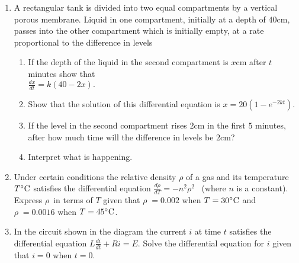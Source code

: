 \begin{enumerate}
\item A rectangular
tank is divided into two equal compartments by a vertical porous membrane.  Liquid in one compartment, initially
at a depth of $40 \mbox{cm}$, passes into the other compartment which is initially empty, at a rate proportional to the
difference in levels 


\begin{enumerate}
\item If the depth of the liquid in the second compartment is $x \mbox{cm}$ after $t$ minutes show that  \\\relax $\frac{d x}{d t} =k \left (40 -2 x\right )\text{.}$ 

\item Show that the solution of this differential equation is $x =20 \left (1 -e^{ -2 k t}\right )\text{.}$ 

\item If the level in the second compartment rises $2 \mbox{cm}$ in the first $5$ minutes, after how much time will the difference in levels be $2 \mbox{cm}$? 

\item Interpret what is happening. \end{enumerate}


\item Under certain conditions the relative density $\rho $ of a gas and its temperature $T \mbox{{\ensuremath{{}^\circ}}C}$ satisfies the differential equation $\frac{d \rho }{d T} = -n^{2} \rho ^{2}$  \ (where $n$ is a constant).  Express $\rho $\ in terms of $T$ given that $\rho \; =0.002$ when $T =30 \mbox{{\ensuremath{{}^\circ}}C}$ and $\rho \; =0.0016$ when $T =45 \mbox{{\ensuremath{{}^\circ}}C}$. 

\item In the circuit shown in the diagram the current $i$ at time $t$ satisfies the differential equation $L \frac{d i}{d t} +R i =E$.  Solve the differential equation for $i$ given that $i =0$ when $t =0.$ \end{enumerate}


\qquad \qquad \qquad \qquad \qquad
\setlength\fboxrule{0in}\setlength\fboxsep{0.2in}


 


